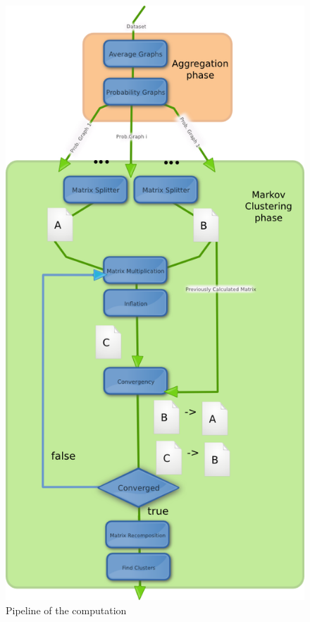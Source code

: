 \begin{figure}[H]
\centering
\includegraphics[scale=0.7]{completepipeline.png}
\caption{Pipeline of the computation}
\label{fig:completepipeline}
\end{figure}
\newpage


